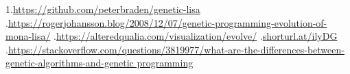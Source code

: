 %
%
% 
% 
%
\begin{thebibliography}


1.\url{https://github.com/peterbraden/genetic-lisa}
.\url{https://rogerjohansson.blog/2008/12/07/genetic-programming-evolution-of-mona-lisa/}
.\url{https://alteredqualia.com/visualization/evolve/}
.\url{shorturl.at/ilyDG}
.\url{https://stackoverflow.com/questions/3819977/what-are-the-differences-between-genetic-algorithms-and-genetic programming}
\end{thebibliography}
